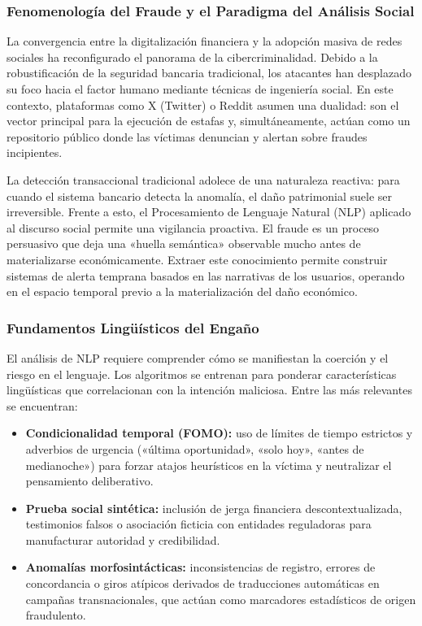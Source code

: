 \subsubsection{Fenomenología del Fraude y el Paradigma del Análisis Social}

La convergencia entre la digitalización financiera y la adopción masiva de redes sociales ha reconfigurado el panorama de la cibercriminalidad. Debido a la robustificación de la seguridad bancaria tradicional, los atacantes han desplazado su foco hacia el factor humano mediante técnicas de ingeniería social. En este contexto, plataformas como X (Twitter) o Reddit asumen una dualidad: son el vector principal para la ejecución de estafas y, simultáneamente, actúan como un repositorio público donde las víctimas denuncian y alertan sobre fraudes incipientes.

La detección transaccional tradicional adolece de una naturaleza reactiva: para cuando el sistema bancario detecta la anomalía, el daño patrimonial suele ser irreversible. Frente a esto, el Procesamiento de Lenguaje Natural (NLP) aplicado al discurso social permite una vigilancia proactiva. El fraude es un proceso persuasivo que deja una «huella semántica» observable mucho antes de materializarse económicamente. Extraer este conocimiento permite construir sistemas de alerta temprana basados en las narrativas de los usuarios, operando en el espacio temporal previo a la materialización del daño económico.

\subsubsection{Fundamentos Lingüísticos del Engaño}

El análisis de NLP requiere comprender cómo se manifiestan la coerción y el riesgo en el lenguaje. Los algoritmos se entrenan para ponderar características lingüísticas que correlacionan con la intención maliciosa. Entre las más relevantes se encuentran:

\begin{itemize}
    \item \textbf{Condicionalidad temporal (FOMO):} uso de límites de tiempo estrictos y adverbios de urgencia («última oportunidad», «solo hoy», «antes de medianoche») para forzar atajos heurísticos en la víctima y neutralizar el pensamiento deliberativo.
    \item \textbf{Prueba social sintética:} inclusión de jerga financiera descontextualizada, testimonios falsos o asociación ficticia con entidades reguladoras para manufacturar autoridad y credibilidad.
    \item \textbf{Anomalías morfosintácticas:} inconsistencias de registro, errores de concordancia o giros atípicos derivados de traducciones automáticas en campañas transnacionales, que actúan como marcadores estadísticos de origen fraudulento.
\end{itemize}

